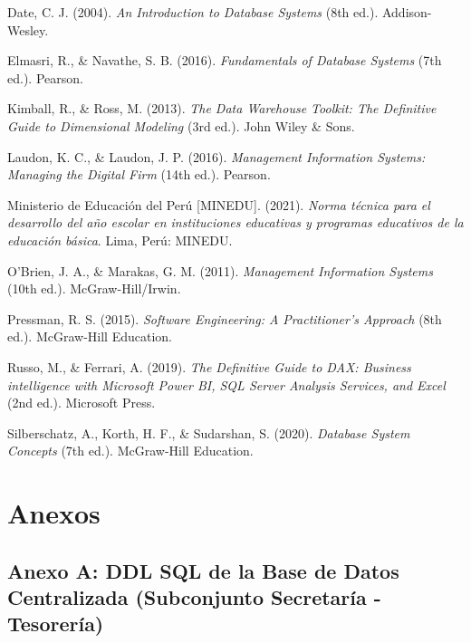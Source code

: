 \documentclass[12pt,a4paper,oneside]{report}
\begin{document}
\begin{description}[leftmargin=1.5em, itemindent=-1.5em]
    \item Date, C. J. (2004). \textit{An Introduction to Database Systems} (8th ed.). Addison-Wesley.
    \item Elmasri, R., \& Navathe, S. B. (2016). \textit{Fundamentals of Database Systems} (7th ed.). Pearson.
    \item Kimball, R., \& Ross, M. (2013). \textit{The Data Warehouse Toolkit: The Definitive Guide to Dimensional Modeling} (3rd ed.). John Wiley \& Sons.
    \item Laudon, K. C., \& Laudon, J. P. (2016). \textit{Management Information Systems: Managing the Digital Firm} (14th ed.). Pearson.
    \item Ministerio de Educación del Perú [MINEDU]. (2021). \textit{Norma técnica para el desarrollo del año escolar en instituciones educativas y programas educativos de la educación básica}. Lima, Perú: MINEDU.
    \item O'Brien, J. A., \& Marakas, G. M. (2011). \textit{Management Information Systems} (10th ed.). McGraw-Hill/Irwin.
    \item Pressman, R. S. (2015). \textit{Software Engineering: A Practitioner's Approach} (8th ed.). McGraw-Hill Education.
    \item Russo, M., \& Ferrari, A. (2019). \textit{The Definitive Guide to DAX: Business intelligence with Microsoft Power BI, SQL Server Analysis Services, and Excel} (2nd ed.). Microsoft Press.
    \item Silberschatz, A., Korth, H. F., \& Sudarshan, S. (2020). \textit{Database System Concepts} (7th ed.). McGraw-Hill Education.
\end{description}

\chapter*{Anexos}

\section*{Anexo A: DDL SQL de la Base de Datos Centralizada (Subconjunto Secretaría - Tesorería)}
\end{document}
